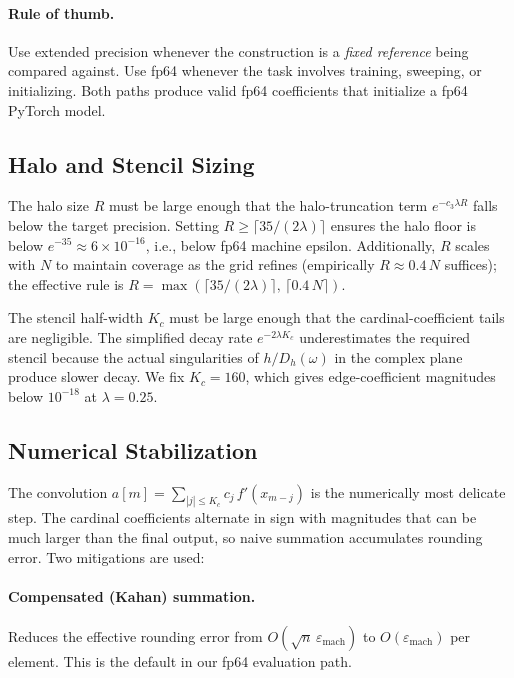 \documentclass{article}
\begin{document}
\paragraph{Rule of thumb.}
Use extended precision whenever the construction is a \emph{fixed reference} being compared against.  Use fp64 whenever the task involves training, sweeping, or initializing.  Both paths produce valid fp64 coefficients that initialize a fp64 PyTorch model.

\subsection{Halo and Stencil Sizing}
\label{app:halo-stencil}

The halo size \(R\) must be large enough that the halo-truncation term \(e^{-c_3\lambda R}\) falls below the target precision.  Setting \(R \ge \lceil 35/(2\lambda)\rceil\) ensures the halo floor is below \(e^{-35} \approx 6\times 10^{-16}\), i.e., below fp64 machine epsilon.  Additionally, \(R\) scales with \(N\) to maintain coverage as the grid refines (empirically \(R \approx 0.4\,N\) suffices); the effective rule is \(R = \max(\lceil 35/(2\lambda)\rceil,\,\lceil 0.4\,N\rceil)\).

The stencil half-width \(K_c\) must be large enough that the cardinal-coefficient tails are negligible.  The simplified decay rate \(e^{-2\lambda K_c}\) underestimates the required stencil because the actual singularities of \(h/D_h(\omega)\) in the complex plane produce slower decay.  We fix \(K_c = 160\), which gives edge-coefficient magnitudes below \(10^{-18}\) at \(\lambda = 0.25\).

\subsection{Numerical Stabilization}
\label{app:numerical-stabilization}

The convolution \(a[m] = \sum_{|j|\le K_c} c_j\,f'(x_{m-j})\) is the numerically most delicate step.  The cardinal coefficients alternate in sign with magnitudes that can be much larger than the final output, so naive summation accumulates rounding error.  Two mitigations are used:

\paragraph{Compensated (Kahan) summation.}
Reduces the effective rounding error from \(O(\sqrt{n}\,\varepsilon_{\mathrm{mach}})\) to \(O(\varepsilon_{\mathrm{mach}})\) per element.  This is the default in our fp64 evaluation path.
\end{document}
